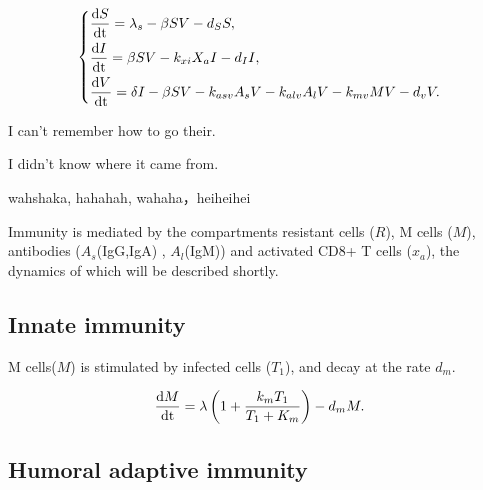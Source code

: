 \documentclass[preprint,11pt,sort&compress,square]{elsarticle}
\numberwithin{equation}{section}
\begin{document}
\begin{equation}\label{virusdynamics}
	\left\{
	\begin{aligned}
		 & \frac{{\rm d } S}{{\rm dt}}=\lambda_{s}-\beta S V-d_{S}S, \\
		 & \frac{{\rm d } I}{{\rm dt}}=\beta S V-k_{xi}X_{a}I-d_{I}I,                          \\
		 & \frac{{\rm d } V}{{\rm dt}}=\delta I-\beta SV-k_{asv}A_{s}V-k_{alv}A_{l}V-k_{mv}MV-d_{v}V.                          \\
	\end{aligned}
	\right.
\end{equation}

I can’t remember how to go their.

I didn’t know where it came from.

wahshaka, hahahah, wahaha，heiheihei

Immunity is mediated by the compartments resistant cells ($R$), M cells ($M$), antibodies ($A_{s}$(IgG,IgA) , $A_{l}$(IgM)) and activated CD8+ T cells ($x_{a}$), the dynamics of which will be described shortly.

\subsection{Innate immunity}



M cells($M$) is stimulated by infected cells ($T_{1}$), and decay at the rate $d_{m}$.

\begin{equation}\label{innateimmunity}
	\begin{aligned}
		 & \frac{{\rm d } M}{{\rm dt}}=\lambda\left(1+\frac{k_{m}T_{1}}{T_{1}+K_{m}}\right)-d_{m}M.   \\
	\end{aligned}
\end{equation}

\subsection{Humoral adaptive immunity}
\end{document}
